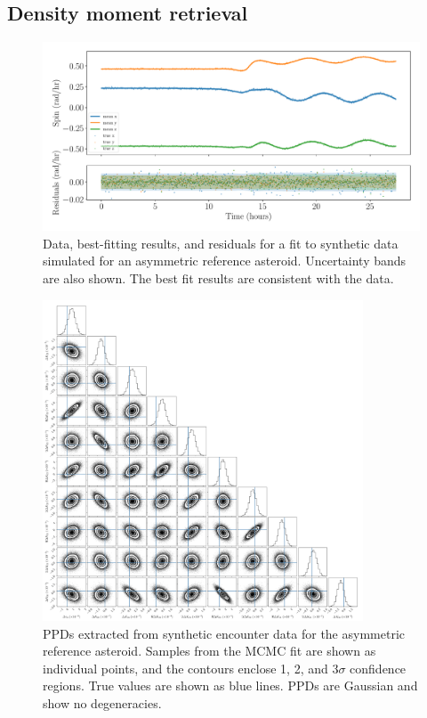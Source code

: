 \documentclass[fleqn,usenatbib]{mnras}
\begin{document}
\subsection{Density moment retrieval}
\label{sec:example-fit}
\begin{figure}
  \centering
  \includegraphics[width=\linewidth]{figs/example-residuals.pdf}
  \caption{Data, best-fitting results, and residuals for a fit to synthetic data simulated for an asymmetric reference asteroid. Uncertainty bands are also shown. The best fit results are consistent with the data.}
  \label{fig:example-residuals}
\end{figure}

\begin{figure}
  \centering
  \includegraphics[width=0.85\textwidth]{figs/example-corner.png}
  \caption{PPDs extracted from synthetic encounter data for the asymmetric reference asteroid. Samples from the MCMC fit are shown as individual points, and the contours enclose 1, 2, and 3$\sigma$ confidence regions. True values are shown as blue lines. PPDs are Gaussian and show no degeneracies.}
  \label{fig:example-corner}
\end{figure}
\end{document}
